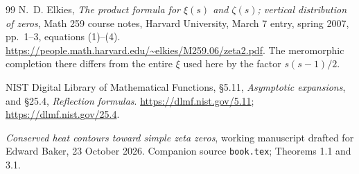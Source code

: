 \documentclass[11pt]{article}
\theoremstyle{remark}
\begin{document}
\begin{thebibliography}{99}
N.~D. Elkies,
\emph{The product formula for $\xi(s)$ and $\zeta(s)$; vertical
distribution of zeros}, Math 259 course notes, Harvard University,
March 7 entry, spring 2007, pp.~1--3, equations (1)--(4).
\url{https://people.math.harvard.edu/~elkies/M259.06/zeta2.pdf}.
The meromorphic completion there differs from the entire $\xi$ used
here by the factor $s(s-1)/2$.

NIST Digital Library of Mathematical Functions,
\S5.11, \emph{Asymptotic expansions}, and
\S25.4, \emph{Reflection formulas}.
\url{https://dlmf.nist.gov/5.11};
\url{https://dlmf.nist.gov/25.4}.

\emph{Conserved heat contours toward simple zeta zeros},
working manuscript drafted for Edward Baker, 23 October 2026.
Companion source \texttt{book.tex}; Theorems 1.1 and 3.1.

\end{thebibliography}
\end{document}

